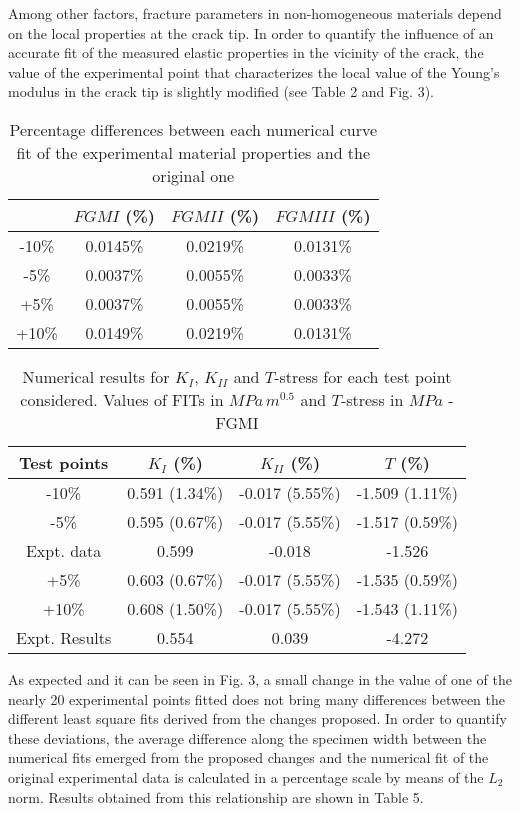 Among other factors, fracture parameters in non-homogeneous materials depend on the local properties at the crack tip. In order to quantify the influence of an accurate fit of the measured elastic properties in the vicinity of the crack, the value of the experimental point that characterizes the local value of the Young's modulus in the crack tip is slightly modified (see Table 2 and Fig. 3).

\begin{table}[h]
\caption{Percentage differences between each numerical curve fit of the experimental material properties and the original one}
\centering
\begin{tabular}{c c c c} 
\hline \hline
 & $FGMI$ (\%) & $FGMII$ (\%) & $FGMIII$ (\%) \\
 \hline
 -10\% & 0.0145\% & 0.0219\% & 0.0131\% \\
 -5\% & 0.0037\% & 0.0055\% & 0.0033\% \\
 +5\% & 0.0037\% & 0.0055\% & 0.0033\% \\
 +10\% & 0.0149\% & 0.0219\% & 0.0131\% \\
 \hline \hline 
\end{tabular}
\label{tab:Table5}
\end{table}

\begin{table*}[bp]
\caption{Numerical results for $K_I$, $K_{II}$ and $T$-stress for each test point considered. Values of FITs in $M\!Pa\,m^{0.5}$ and $T$-stress in $M\!Pa$ - FGMI}
\centering
\begin{tabular}{c c c c} 
\hline \hline
Test points & $K_I$ (\%) & $K_{II}$ (\%) & $T$ (\%) \\
 \hline
 -10\% & 0.591 (1.34\%) & -0.017 (5.55\%)& -1.509 (1.11\%)\\
 -5\% & 0.595 (0.67\%)& -0.017 (5.55\%)& -1.517 (0.59\%)\\
 Expt. data & 0.599 & -0.018 & -1.526\\
 +5\% & 0.603 (0.67\%)& -0.017 (5.55\%)& -1.535 (0.59\%)\\
 +10\% & 0.608 (1.50\%)& -0.017 (5.55\%)& -1.543 (1.11\%)\\
 \hline
 Expt. Results & 0.554 & 0.039 & -4.272\\
 \hline \hline 
\end{tabular}
\label{tab:Table6}
\end{table*}

As expected and it can be seen in Fig. 3, a small change in the value of one of the nearly 20 experimental points fitted does not bring many differences between the different least square fits derived from the changes proposed. In order to quantify these deviations, the average difference along the specimen width between the numerical fits emerged from the proposed changes and the numerical fit of the original experimental data is calculated in a percentage scale by means of the $L_2$ norm. Results obtained from this relationship are shown in Table 5.

